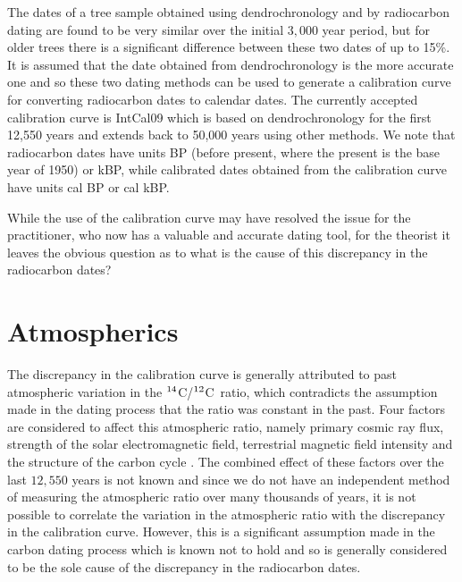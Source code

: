 \documentclass[12pt]{article}
\newcommand{\cft}{$^{\rm 14}$C}
\newcommand{\ctw}{$^{\rm 12}$C}
\newcommand{\INTCAL}{{\sc IntCal}}
\begin{document}
The dates of a tree 
sample obtained using dendrochronology and by radiocarbon dating
are found to be very similar over the initial $3,000$ year 
period, but for older trees there is a significant difference between 
these two dates of up to 15\%. It is assumed that the date obtained from 
dendrochronology is the more accurate one and so these two dating methods 
can be used to generate a calibration curve for converting radiocarbon 
dates to calendar dates. The currently accepted calibration curve is 
\INTCAL09 \cite{reimer09} which is based on dendrochronology for
the first 12,550 years and extends back to 50,000 years using other
methods. We note that radiocarbon dates have units BP (before 
present, where the present is the base year of 1950) or kBP, while 
calibrated dates obtained from the calibration curve have units cal BP 
or cal kBP.

While the use of the calibration curve may have resolved the issue
for the practitioner, who now has a valuable and accurate dating tool,
for the theorist it leaves the obvious question as to what is the cause of
this discrepancy in the radiocarbon dates?

\section{Atmospherics}
\label{atmospherics}

The discrepancy in the calibration curve is generally attributed
to past atmospheric variation in the 
\cft/\ctw~ratio, which contradicts the assumption made in 
the dating process that the ratio was constant in the past.
Four factors are considered to affect this atmospheric ratio, namely
primary cosmic ray flux, strength of the solar electromagnetic field, 
terrestrial magnetic field intensity and the structure of the carbon cycle 
\cite{aitken90,bard98,beck01}.
The combined effect of these factors over the last $12,550$ years is 
not known and since we do not have an independent method of measuring the
atmospheric ratio over many thousands of years, 
it is not possible to correlate the variation in
the atmospheric ratio with the discrepancy in the calibration curve.
However, this is a significant assumption made in the carbon dating process 
which is known not to hold and so is generally considered to be the
sole cause of the discrepancy in the radiocarbon dates.
\end{document}
